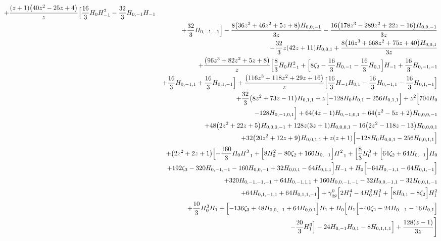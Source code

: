 \begin{eqnarray}
+\frac{(z+1) \big(40 z^2-25 z+4\big) }{z} \Bigl[\frac{16}{3}  H_0 H_{-1}^2-\frac{32}{3}  H_{0,-1}  H_{-1}
\nonumber \\ &&
+\frac{32}{3}  H_{0,-1,-1}\Bigr]
-\frac{8 \big(36 z^3+46 z^2+5  z+8\big) H_{0,0,-1}}{3 z}-\frac{16  \big(178 z^3-289 z^2+22 z-16\big)  H_{0,0,-1}}{3 z}
\nonumber \\ &&
-\frac{32}{3}  z (42 z+11) H_{0,0,1}+\frac{8 \big(16  z^3+668 z^2+75 z+40\big) H_{0,0,1}}{3 z}
\nonumber \\ &&
+\frac{\big(96 z^3+82 z^2+5 z+8\big) }{z}
 \Bigl[\frac{8}{3} H_0 H_{-1}^2+\Bigl[8 \zeta_2-\frac{16}{3}  H_{0,-1}-\frac{16}{3} H_{0,1}\Bigr] H_{-1}+\frac{16}{3}  H_{0,-1,-1}
\nonumber \\ &&
+\frac{16}{3} H_{0,-1,1}+\frac{16}{3}  H_{0,1,-1}\Bigr]
+\frac{\big(116 z^3+118 z^2+29 z+16\big) }{z}
 \Bigl[\frac{16}{3}  H_{-1} H_{0,1}-\frac{16}{3}   H_{0,-1,1}-\frac{16}{3}  H_{0,1,-1}\Bigr]
\nonumber \\ &&
+\frac{32}{3} \big(8z^2+73 z-11\big) H_{0,1,1}+z \Bigl[-128  H_0 H_{0,1}-256 H_{0,1,1}\Bigr]+z^2 \Bigl[704  H_0
\nonumber \\ &&
-128 H_{0,-1,0,1}\Bigr]+64  (4 z-1)H_{0,-1,0,1}+64 \big(z^2-5 z+2\big) H_{0,0,0,-1}
\nonumber \\ &&
+48  \big(2 z^2+22z+5\big) H_{0,0,0,-1}+128  z (3 z+1) H_{0,0,0,1}-16 \big(2 z^2-118z-13\big) H_{0,0,0,1}
\nonumber \\ &&
+32 \big(20 z^2+12 z+9\big) H_{0,0,1,1}+z (z+1) \Bigl[-128 H_0 H_{0,0,1}-256  H_{0,0,1,1}\Bigr]
\nonumber \\ &&
+\big(2 z^2+2 z+1\big)\Bigl[-\frac{160}{3} H_0 H_{-1}^3+\Bigl[8 H_0^2-80 \zeta_2
+160H_{0,-1}\Bigr] H_{-1}^2+\Bigl[\frac{8}{3} H_0^3
+\Bigl[64 \zeta_2+64 H_{0,-1}\Bigr] H_0
\nonumber \\ &&
+192 \zeta_3-320 H_{0,-1,-1}
-160 H_{0,0,-1}+32H_{0,0,1}-64H_{0,1,1}\Bigr] H_{-1}
+H_0 \Bigl[-64  H_{0,-1,1}-64 H_{0,1,-1}\Bigr]
\nonumber \\ &&
+320 H_{0,-1,-1,-1}
+64H_{0,-1,1,1}
+160 H_{0,0,-1,-1}-32 H_{0,0,-1,1}-32H_{0,0,1,-1}\nonumber \\ &&
+64H_{0,1,-1,1}+64 H_{0,1,1,-1}\Bigr]+{\gamma}_{qg}^{0}\Bigl[2 H_1^4-4 H_0^2 H_1^2+\Bigl[8 H_{0,1}-8 \zeta_2\Bigr]H_1^2
\nonumber \\ &&
+\frac{10}{3} H_0^3 H_1+\Bigl[-136 \zeta_3+48 H_{0,0,-1}+64H_{0,0,1}\Bigr] H_1+H_0 \Bigl[H_1 \Bigl[-40 \zeta_2-24 H_{0,-1}-16H_{0,1}\Bigr]
\nonumber \\ &&
-\frac{20}{3} H_1^3\Bigr]-24 H_{0,-1} H_{0,1}-8H_{0,1,1,1}\Bigr]+\frac{128  (z-1)}{3 z}\Biggr]

\end{eqnarray}
